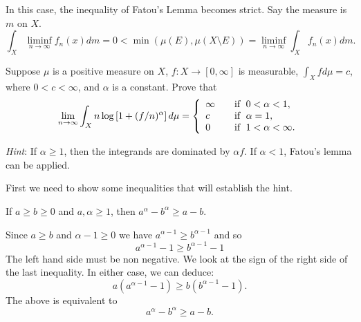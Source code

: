 \begin{enumerate}
In this case, the inequality of Fatou's Lemma becomes strict.
Say the measure is $m$ on $X$.
\begin{equation*}
\int_X \liminf_{n\to\infty} f_n(x)dm
= 0 < \min(\mu(E),\mu(X\setminus E))
= \liminf_{n\to\infty} \int_X f_n(x)dm.
\end{equation*}

\begin{excopy}
Suppose \(\mu\) is a positive measure on $X$, \(f:X\to[0,\infty]\)
is measurable, \(\int_X fd\mu = c\), where \(0<c<\infty\),
and \(\alpha\) is a constant. Prove that
\begin{equation*}
\lim_{n\to\infty} \int_X n\log \left[ 1 + (f/n)^\alpha\right]d\mu
 =\left\{\begin{array}{l@{\qquad}l}
         \infty & \textrm{if }\; 0<\alpha<1,\\
         c      & \textrm{if }\; \alpha = 1,\\
         0      & \textrm{if }\; 1 < \alpha < \infty.
         \end{array}
         \right.
\end{equation*}


\emph{Hint}: If \(\alpha\geq 1\), then the integrands are dominated by
\(\alpha f\).
If \(\alpha<1\),
Fatou's lemma  can be applied.
\end{excopy}

First we need to show some inequalities that
will establish the hint.
\begin{llem} \label{llem:apbp:geq}
If \(a \geq b \geq 0\) and \(a,\alpha\geq 1\), then
\(a^\alpha - b^\alpha \geq a - b\).
\end{llem}

\begin{thmproof}
Since \(a\geq b\) and \(\alpha-1\geq 0\) we have
\(a^{\alpha-1} \geq b^{\alpha-1}\) and so
\begin{equation*}
a^{\alpha-1} - 1 \geq b^{\alpha-1} - 1
\end{equation*}
The left hand side must be non negative.
We look at the sign of the right side of the last inequality.
In either case, we can deduce:
\begin{equation*}
a (a^{\alpha-1} - 1) \geq b(b^{\alpha-1} - 1).
\end{equation*}
The above is equivalent to
\begin{equation*}
a^\alpha - b^\alpha \geq a - b.
\end{equation*}
\end{thmproof}



\end{enumerate}
